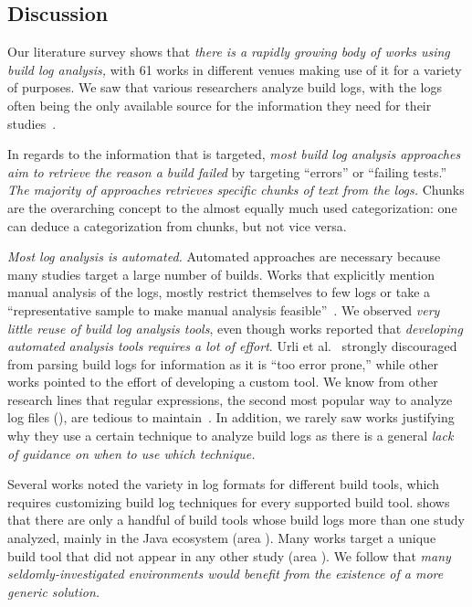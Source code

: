 \documentclass[10pt,journal,compsoc]{IEEEtran}
\newcommand\circlenum[1]{\raisebox{1.2pt}{\textcircled{\hspace{0.35pt}\scriptsize{\raisebox{-.4pt}{#1}}}}}
\begin{document}
\subsection{Discussion}
\label{sec:lit-sur:discussion}

Our literature survey shows that \emph{there is a rapidly growing body
of works using build log analysis,}
with 61 works in different venues making use of it for a variety of
purposes.
We saw that various researchers analyze build logs, with the
logs often being the only available source for the
information they need for their studies~\cite{ren2018automated,
seo2014programmers,beller2017oops,zampetti2017open,rausch2017empirical}.

In regards to the information that is targeted, \emph{most build log
analysis approaches aim to retrieve the reason a build failed} by
targeting ``errors'' or ``failing tests.''
\emph{The majority of approaches retrieves specific chunks of
text from the logs.} Chunks are the overarching concept to
the almost equally much used categorization: one can deduce a
categorization from chunks, but not vice versa.

\emph{Most log analysis is automated.} Automated approaches are
necessary because many studies target a large number of builds.
Works
that explicitly mention manual analysis of the logs, mostly
restrict themselves to few logs or take a ``representative sample to
make manual analysis feasible''~\cite{zolfagharinia2017not}.
We observed \emph{very little reuse of build log analysis tools},
even though works reported that
\emph{developing automated analysis tools requires a lot of effort}.
Urli et al.~\cite{urli2018design} strongly discouraged from parsing
build logs for information as it is ``too error prone,'' while other
works pointed to the effort of developing a custom tool.
We know from other research lines that regular expressions, the second
most popular way to analyze log files (),
are tedious to
maintain~\cite{michael2019regexes}.
In addition, we rarely saw works justifying why they use a certain
technique to analyze build logs as there is a general \emph{lack of
guidance on when to use which technique.}

Several works noted the variety in log formats for different build
tools, which requires customizing build log techniques for
every supported build tool.
 shows that there are only a handful of
build tools whose build logs more than one study analyzed, mainly in
the Java ecosystem (area \circlenum{A}).
Many works target a unique build tool that did not appear in any other
study (area \circlenum{B}).
We follow that \emph{many seldomly-investigated
environments would benefit from the
existence of a more generic solution.}
\end{document}

